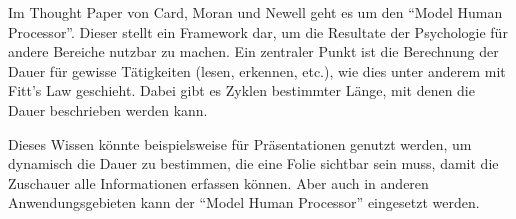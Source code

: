 \documentclass[a4paper,10pt]{scrartcl}
\begin{document}
\kopf
\renewcommand{\figurename}{Figure}


Im Thought Paper von Card, Moran und Newell geht es um den "`Model Human Processor"'. Dieser stellt ein Framework dar, um die Resultate der Psychologie für andere Bereiche nutzbar zu machen. Ein zentraler Punkt ist die Berechnung der Dauer für gewisse Tätigkeiten (lesen, erkennen, etc.), wie dies unter anderem mit Fitt's Law geschieht. Dabei gibt es Zyklen bestimmter Länge, mit denen die Dauer beschrieben werden kann.

Dieses Wissen könnte beispielsweise für Präsentationen genutzt werden, um dynamisch die Dauer zu bestimmen, die eine Folie sichtbar sein muss, damit die Zuschauer alle Informationen erfassen können. Aber auch in anderen Anwendungsgebieten kann der "`Model Human Processor"' eingesetzt werden.
\end{document}
